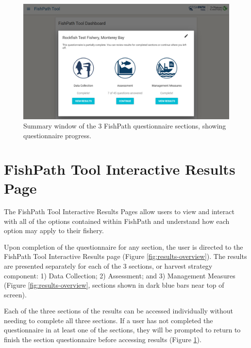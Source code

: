 \documentclass[
  11pt,
]{book}
\begin{document}
\begin{figure}
 
 {\centering \includegraphics[width=0.95\linewidth]{images/summary-screen} 
 
 }
 
 \caption{Summary window of the 3 FishPath questionnaire sections, showing questionnaire progress.}\label{fig:summary-screen}
 \end{figure}

\hypertarget{fishpath-tool-interactive-results-page}{%
\chapter{FishPath Tool Interactive Results Page}\label{fishpath-tool-interactive-results-page}}

The FishPath Tool Interactive Results Pages allow users to view and interact with all of the options contained within FishPath and understand how each option may apply to their fishery.

Upon completion of the questionnaire for any section, the user is directed to the FishPath Tool Interactive Results page (Figure \ref{fig:results-overview}). The results are presented separately for each of the 3 sections, or harvest strategy component: 1) Data Collection; 2) Assessment; and 3) Management Measures (Figure \ref{fig:results-overview}, sections shown in dark blue bars near top of screen).

Each of the three sections of the results can be accessed individually without needing to complete all three sections. If a user has not completed the questionnaire in at least one of the sections, they will be prompted to return to finish the section questionnaire before accessing results (Figure \ref{fig:summary-screen}).
\end{document}
